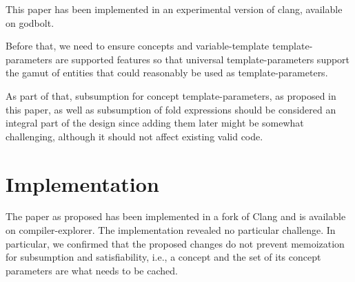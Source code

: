 \documentclass{wg21}
\begin{document}
This paper has been implemented in an experimental version of clang, available on godbolt.

Before that, we need to ensure concepts and variable-template template-parameters are supported features so that universal
template-parameters support the gamut of entities that could reasonably be used as template-parameters.

As part of that, subsumption for concept template-parameters, as proposed in this paper, as well as subsumption of fold expressions
should be considered an integral part of the design since adding them later might be somewhat challenging, although it should not affect existing valid code.

%
%
%
%

\section{Implementation}


The paper as proposed has been implemented in a fork of Clang and is available on compiler-explorer.
The implementation revealed no particular challenge. In particular, we confirmed that the proposed changes
do not prevent memoization for subsumption and satisfiability, i.e., a concept and the set of its concept parameters
are what needs to be cached.
\end{document}

